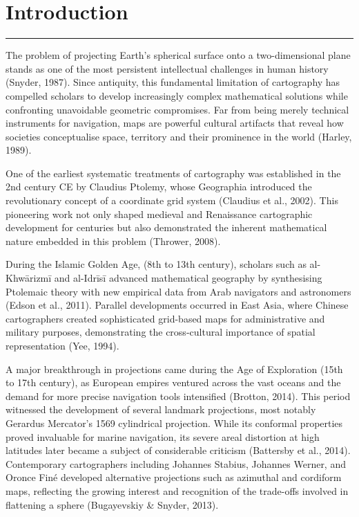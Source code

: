 \section{Introduction}
\hrule height 1pt
\vspace*{5pt}
The problem of projecting Earth's spherical surface onto a two-dimensional 
plane stands as one of the most persistent intellectual challenges in human 
history (Snyder, 1987). Since antiquity, this fundamental limitation of 
cartography has compelled scholars to develop increasingly complex 
mathematical solutions while confronting unavoidable geometric compromises. 
Far from being merely technical instruments for navigation, maps are powerful 
cultural artifacts that reveal how societies conceptualise space, territory 
and their prominence in the world (Harley, 1989). 

One of the earliest systematic treatments of cartography was established in 
the 2nd century CE by Claudius Ptolemy, whose Geographia introduced the 
revolutionary concept of a coordinate grid system (Claudius et al., 2002).  
This pioneering work not only shaped medieval and Renaissance cartographic 
development for centuries but also demonstrated the inherent mathematical 
nature embedded in this problem (Thrower, 2008). 

During the Islamic Golden Age, (8th to 13th century), scholars such as 
al-Khwārizmī and al-Idrīsī advanced mathematical geography by synthesising 
Ptolemaic theory with new empirical data from Arab navigators and astronomers 
(Edson et al., 2011). Parallel developments occurred in East Asia, where 
Chinese cartographers created sophisticated grid-based maps for administrative 
and military purposes, demonstrating the cross-cultural importance of spatial 
representation (Yee, 1994). 

A major breakthrough in projections came during the Age of Exploration (15th 
to 17th century), as European empires ventured across the vast oceans and the 
demand for more precise navigation tools intensified (Brotton, 2014). This 
period witnessed the development of several landmark projections, most notably 
Gerardus Mercator's 1569 cylindrical projection. While its conformal 
properties proved invaluable for marine navigation, its severe areal 
distortion at high latitudes later became a subject of considerable criticism 
(Battersby et al., 2014). Contemporary cartographers including Johannes 
Stabius, Johannes Werner, and Oronce Finé developed alternative projections 
such as azimuthal and cordiform maps, reflecting the growing interest and 
recognition of the trade-offs involved in flattening a sphere (Bugayevskiy \& Snyder, 2013). 

